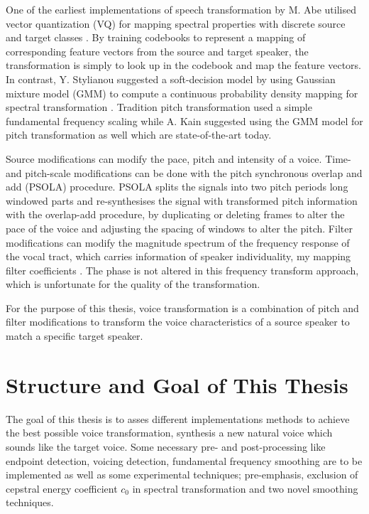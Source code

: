 One of the earliest implementations of speech transformation by M. Abe utilised vector quantization (VQ) for mapping spectral properties with discrete source and target classes \cite{abe88}. By training codebooks to represent a mapping of corresponding feature vectors from the source and target speaker, the transformation is simply to look up in the codebook and map the feature vectors. In contrast, Y. Stylianou \etal suggested a soft-decision model by using Gaussian mixture model (GMM) to compute a continuous probability density mapping for spectral transformation \cite{stylianou98}. Tradition pitch transformation used a simple fundamental frequency scaling while A. Kain \etal suggested using the GMM model for pitch transformation as well \cite{kain00} which are state-of-the-art today.

Source modifications can modify the pace, pitch and intensity of a voice. Time- and pitch-scale modifications can be done with the pitch synchronous overlap and add (PSOLA) procedure. PSOLA splits the signals into two pitch periods long windowed parts and re-synthesises the signal with transformed pitch information with the overlap-add procedure, by duplicating or deleting frames to alter the pace of the voice and adjusting the spacing of windows to alter the pitch. Filter modifications can modify the magnitude spectrum of the frequency response of the vocal tract, which carries information of speaker individuality, my mapping filter coefficients \cite{stylianou09,nguyen09}. The phase is not altered in this frequency transform approach, which is unfortunate for the quality of the transformation.

For the purpose of this thesis, voice transformation is a combination of pitch and filter modifications to transform the voice characteristics of a source speaker to match a specific target speaker. 

\section{Structure and Goal of This Thesis} %
\label{sec:structure_and_goal_of_this_thesis}
The goal of this thesis is to asses different implementations methods to achieve the best possible voice transformation, \ie synthesis a new natural voice which sounds like the target voice. Some necessary pre- and post-processing like endpoint detection, voicing detection, fundamental frequency smoothing are to be implemented as well as some experimental techniques; pre-emphasis, exclusion of cepstral energy coefficient $c_0$ in spectral transformation and two novel smoothing techniques.

